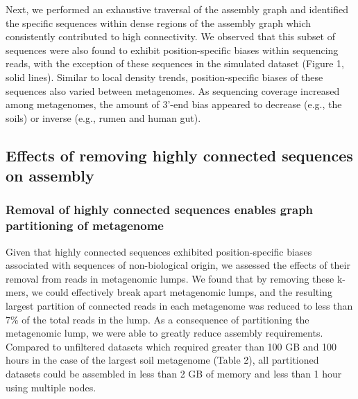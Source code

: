 \documentclass[10pt]{article}
\begin{document}
Next, we performed an exhaustive traversal of the assembly graph and identified the specific sequences within dense regions of the assembly graph which consistently contributed to high connectivity.  We observed that this subset of sequences were also found to exhibit position-specific biases within sequencing reads, with the exception of these sequences in the simulated dataset (Figure 1, solid lines).  Similar to local density trends, position-specific biases of these sequences also varied between metagenomes.  As sequencing coverage increased among metagenomes, the amount of 3'-end bias appeared to decrease (e.g., the soils) or inverse (e.g., rumen and human gut).

\subsection*{Effects of removing highly connected sequences on assembly}

\subsubsection*{Removal of highly connected sequences enables graph partitioning of metagenome}
Given that highly connected sequences exhibited position-specific biases associated with sequences of non-biological origin, we assessed the effects of their removal from reads in metagenomic lumps.  We found that by removing these k-mers, we could effectively break apart metagenomic lumps, and the resulting largest partition of connected reads in each metagenome was reduced to less than 7\% of the total reads in the lump.  As a consequence of partitioning the metagenomic lump, we were able to greatly reduce assembly requirements.  Compared to unfiltered datasets which required greater than 100 GB and 100 hours in the case of the largest soil metagenome (Table 2), all partitioned datasets could be assembled in less than 2 GB of memory and less than 1 hour using multiple nodes. 
\end{document}
